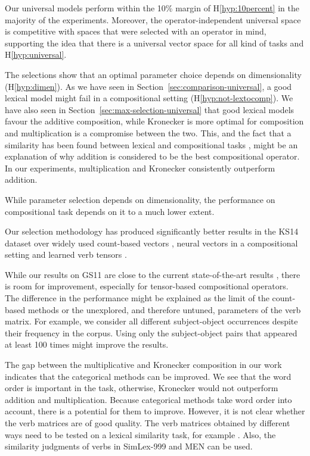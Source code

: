 Our universal models perform within the 10\% margin of H\ref{hyp:10percent} in the majority of the experiments. Moreover, the operator-independent universal space is competitive with spaces that were selected with an operator in mind, supporting the idea that there is a universal vector space for all kind of tasks and H\ref{hyp:universal}.

The selections show that an optimal parameter choice depends on dimensionality (H\ref{hyp:dimen}). As we have seen in Section~\ref{sec:comparison-universal}, a good lexical model might fail in a compositional setting (H\ref{hyp:not-lextocomp}). We have also seen in Section~\ref{sec:max-selection-universal} that good lexical models favour the additive composition, while Kronecker is more optimal for composition and multiplication is a compromise between the two. This, and the fact that a similarity has been found between lexical and compositional tasks \cite[\textcolor{citecolor}{Section~4}]{kiela-clark:2014:CVSC}, might be an explanation of why addition is considered to be the best compositional operator. In our experiments, multiplication and Kronecker consistently outperform addition.

While parameter selection depends on dimensionality, the performance on compositional task depends on it to a much lower extent.

Our selection methodology has produced significantly better results in the KS14 dataset over widely used count-based vectors \cite{milajevs-EtAl:2014:EMNLP2014}, neural vectors in a compositional setting \cite{milajevs-EtAl:2014:EMNLP2014,kim2015neural} and learned verb tensors \cite{fried-polajnar-clark:2015:ACL-IJCNLP,hashimoto-tsuruoka:2016:P16-1,hashimoto-tsuruoka:2015:CVSC}.

While our results on GS11 are close to the current state-of-the-art results \cite{hashimoto-tsuruoka:2016:P16-1}, there is room for improvement, especially for tensor-based compositional operators. The difference in the performance might be explained as the limit of the count-based methods or the unexplored, and therefore untuned, parameters of the verb matrix. For example, we consider all different subject-object occurrences despite their frequency in the corpus. Using only the subject-object pairs that appeared at least 100 times might improve the results.

The gap between the multiplicative and Kronecker composition in our work indicates that the categorical methods can be improved. We see that the word order is important in the task, otherwise, Kronecker would not outperform addition and multiplication. Because categorical methods take word order into account, there is a potential for them to improve. However, it is not clear whether the verb matrices are of good quality. The verb matrices obtained by different ways need to be tested on a lexical similarity task, for example . Also, the similarity judgments of verbs in SimLex-999 and MEN can be used.




